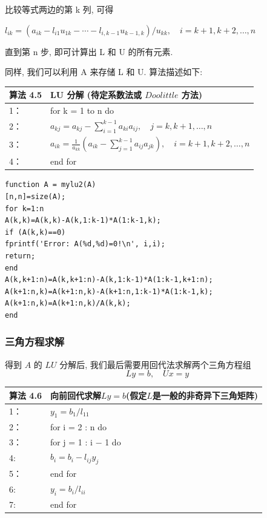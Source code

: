 \documentclass[12pt,a4paper]{article}
\begin{document}
比较等式两边的第 k 列, 可得

$l_{i k}=\left(a_{i k}-l_{i 1} u_{1 k}-\cdots-l_{i, k-1} u_{k-1, k}\right) / u_{k k}, \quad i=k+1, k+2, \ldots, n$

直到第 n 步, 即可计算出 L 和 U 的所有元素.

同样, 我们可以利用 A 来存储 L 和 U. 算法描述如下:
\begin{table}  
	\begin{tabular*}{16cm}{ll}  
		\hline  
		算法 4.5 &LU 分解 (待定系数法或 $Doolittle$ 方法)\\  
		\hline  
		1：   & for k = 1 to n do\\  
		2：   & \qquad $a_{k j}=a_{k j}-\sum_{i=1}^{k-1} a_{k i} a_{i j}, \quad j=k, k+1, \ldots, n$\\
		3：   & \qquad $a_{i k}=\frac{1}{a_{k k}}\left(a_{i k}-\sum_{j=1}^{k-1} a_{i j} a_{j k}\right), \quad i=k+1, k+2, \ldots, n$\\
		4：   & end for\\
		\hline  
	\end{tabular*}  
\end{table} 

\begin{lstlisting}[language={[ANSI]C}] 
% Matlab code 2 : 待定系数法 LU 分解
function A = mylu2(A)
[n,n]=size(A);
for k=1:n
A(k,k)=A(k,k)-A(k,1:k-1)*A(1:k-1,k);
if (A(k,k)==0)
fprintf('Error: A(%d,%d)=0!\n', i,i);
return;
end
A(k,k+1:n)=A(k,k+1:n)-A(k,1:k-1)*A(1:k-1,k+1:n);
A(k+1:n,k)=A(k+1:n,k)-A(k+1:n,1:k-1)*A(1:k-1,k);
A(k+1:n,k)=A(k+1:n,k)/A(k,k);
end
\end{lstlisting}

\subsubsection{三角方程求解}
得到 $A$ 的 $LU$ 分解后, 我们最后需要用回代法求解两个三角方程组
$$L y=b, \quad U x=y$$

\begin{table}  
	\begin{tabular*}{16cm}{ll}  
		\hline  
		算法 4.6 &向前回代求解$Ly =b$(假定$L$是一般的非奇异下三角矩阵)\\  
		\hline  
		1：   &$y_{1}=b_{1} / l_{11}$\\  
		2：   & for i = 2 : n do\\
		3：   & \qquad for j = 1 : i − 1 do\\
		4:    & \qquad \qquad$b_{i}=b_{i}-l_{i j} y_{j}$\\
		5：   & \qquad end for\\
		6:    & \qquad $y_{i}=b_{i} / l_{i i}$\\
		7:    & end for\\
		\hline  
	\end{tabular*}  
\end{table}
\end{document}
